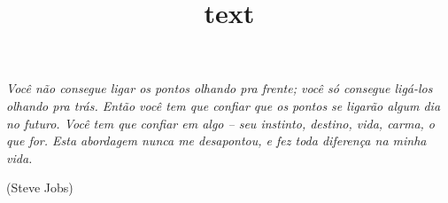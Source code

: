 \documentclass[portugues]{ic-tese}
\begin{document}

\title{text}




\mestrado







\frontmatter



\begin{epigrafe}
{\it
Você não consegue ligar os pontos olhando pra frente; você só consegue ligá-los olhando pra trás. Então você tem que confiar que os pontos se ligarão algum dia no futuro. Você tem que confiar em algo – seu instinto, destino, vida, carma, o que for. Esta abordagem nunca me desapontou, e fez toda diferença na minha vida.}

\hfill (Steve Jobs)
\end{epigrafe}
\end{document}
